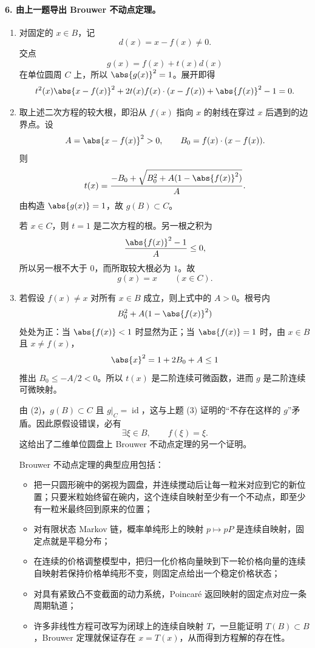 \paragraph{6. 由上一题导出 Brouwer 不动点定理。}
\begin{xsolution}
\begin{enumerate}[label=(\arabic*)]
\item 对固定的 $x\in B$，记
\[
  d(x)=x-f(x)\ne0.
\]
交点
\[
  g(x)=f(x)+t(x)d(x)
\]
在单位圆周 $C$ 上，所以 $\abs{g(x)}^2=1$。展开即得
\[
  t^2(x)\abs{x-f(x)}^2
  +2t(x)f(x)\cdot(x-f(x))
  +\abs{f(x)}^2-1=0.
\]

\item 取上述二次方程的较大根，即沿从 $f(x)$ 指向 $x$ 的射线在穿过 $x$ 后遇到的边界点。设
\[
  A=\abs{x-f(x)}^2>0,
  \qquad B_0=f(x)\cdot(x-f(x)).
\]
则
\[
  t(x)=\frac{-B_0+\sqrt{B_0^2+A(1-\abs{f(x)}^2)}}{A}.
\]
由构造 $\abs{g(x)}=1$，故 $g(B)\subset C$。

若 $x\in C$，则 $t=1$ 是二次方程的根。另一根之积为
\[
  \frac{\abs{f(x)}^2-1}{A}\le0,
\]
所以另一根不大于 $0$，而所取较大根必为 $1$。故
\[
  g(x)=x\qquad(x\in C).
\]

\item 若假设 $f(x)\ne x$ 对所有 $x\in B$ 成立，则上式中的 $A>0$。根号内
\[
  B_0^2+A(1-\abs{f(x)}^2)
\]
处处为正：当 $\abs{f(x)}<1$ 时显然为正；当 $\abs{f(x)}=1$ 时，由 $x\in B$ 且 $x\ne f(x)$，
\[
  \abs{x}^2
  =1+2B_0+A\le1
\]
推出 $B_0\le-A/2<0$。所以 $t(x)$ 是二阶连续可微函数，进而 $g$ 是二阶连续可微映射。

由 (2)，$g(B)\subset C$ 且 $g|_C=\operatorname{id}$，这与上题 (3) 证明的“不存在这样的 $g$”矛盾。因此原假设错误，必有
\[
  \exists\xi\in B,\qquad f(\xi)=\xi.
\]
这给出了二维单位圆盘上 Brouwer 不动点定理的另一个证明。

Brouwer 不动点定理的典型应用包括：
\begin{itemize}
  \item 把一只圆形碗中的粥视为圆盘，并连续搅动后让每一粒米对应到它的新位置；只要米粒始终留在碗内，这个连续自映射至少有一个不动点，即至少有一粒米最终回到原来的位置；
  \item 对有限状态 Markov 链，概率单纯形上的映射 $p\mapsto pP$ 是连续自映射，固定点就是平稳分布；
  \item 在连续的价格调整模型中，把归一化价格向量映到下一轮价格向量的连续自映射若保持价格单纯形不变，则固定点给出一个稳定价格状态；
  \item 对具有紧致凸不变截面的动力系统，Poincar\'e 返回映射的固定点对应一条周期轨道；
  \item 许多非线性方程可改写为闭球上的连续自映射 $T$，一旦能证明 $T(B)\subset B$，Brouwer 定理就保证存在 $x=T(x)$，从而得到方程解的存在性。
\end{itemize}
\end{enumerate}
\end{xsolution}
